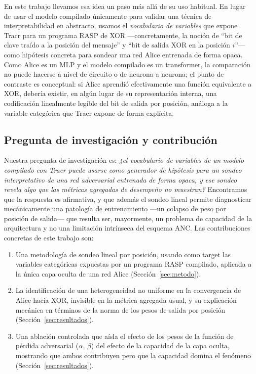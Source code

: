 \documentclass[manuscript,screen]{acmart}
\begin{document}
En este trabajo llevamos esa idea un paso más allá de su uso habitual. En lugar de usar el
modelo compilado únicamente para validar una técnica de interpretabilidad en abstracto,
usamos el \emph{vocabulario de variables} que expone Tracr para un programa RASP de XOR
—concretamente, la noción de ``bit de clave traído a la posición del mensaje'' y ``bit de
salida XOR en la posición $i$''— como hipótesis concreta para sondear una red Alice
entrenada de forma opaca. Como Alice es un MLP y el modelo compilado es un transformer, la
comparación no puede hacerse a nivel de circuito o de neurona a neurona; el punto de
contraste es conceptual: si Alice aprendió efectivamente una función equivalente a XOR,
debería existir, en algún lugar de su representación interna, una codificación linealmente
legible del bit de salida por posición, análoga a la variable categórica que Tracr expone de
forma explícita.

\subsection{Pregunta de investigación y contribución}

Nuestra pregunta de investigación es: \emph{¿el vocabulario de variables de un modelo
compilado con Tracr puede usarse como generador de hipótesis para un sondeo interpretativo de
una red adversarial entrenada de forma opaca, y ese sondeo revela algo que las métricas
agregadas de desempeño no muestran?} Encontramos que la respuesta es afirmativa, y que además
el sondeo lineal permite diagnosticar mecánicamente una patología de entrenamiento —un colapso
de peso por posición de salida— que resulta ser, mayormente, un problema de capacidad de la
arquitectura y no una limitación intrínseca del esquema ANC. Las contribuciones concretas de
este trabajo son:

\begin{enumerate}
\item Una metodología de sondeo lineal por posición, usando como target las variables
  categóricas expuestas por un programa RASP compilado, aplicada a la única capa oculta de una
  red Alice (Sección~\ref{sec:metodo}).
\item La identificación de una heterogeneidad no uniforme en la convergencia de Alice hacia
  XOR, invisible en la métrica agregada usual, y su explicación mecánica en términos de la
  norma de los pesos de salida por posición (Sección~\ref{sec:resultados}).
\item Una ablación controlada que aísla el efecto de los pesos de la función de pérdida
  adversarial (\(\alpha\), \(\beta\)) del efecto de la capacidad de la capa oculta, mostrando
  que ambos contribuyen pero que la capacidad domina el fenómeno (Sección~\ref{sec:resultados}).
\end{enumerate}
\end{document}
